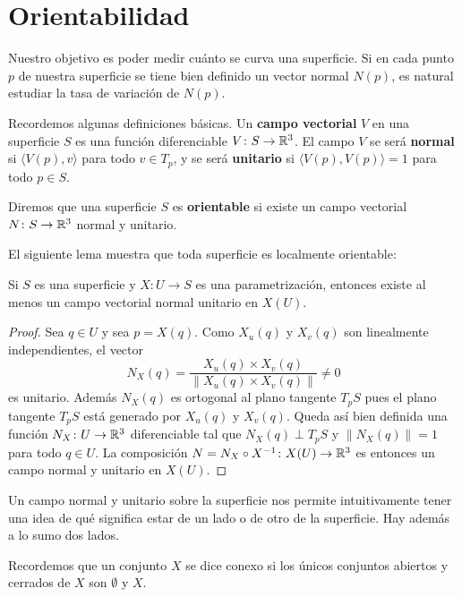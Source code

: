 \chapter{Orientabilidad}

Nuestro objetivo es poder medir cuánto se curva una superficie. Si en cada
punto $p$ de nuestra superficie se tiene bien definido un vector normal $N(p)$,
es natural estudiar la tasa de variación de $N(p)$. 

Recordemos algunas definiciones básicas.  Un \textbf{campo vectorial} $V$ en
una superficie $S$ es una función diferenciable $V\colon S\to\mathbb{R}^3$. El campo
$V$ se será \textbf{normal} si $\langle V(p), v\rangle$ para todo $v\in T_p$, y
se será \textbf{unitario} si $\langle V(p),V(p)\rangle=1$ para todo $p\in S$. 

\begin{definition}
	Diremos que una superficie $S$ es \textbf{orientable} si existe un campo
	vectorial $N\colon S\to\mathbb{R}^3$ normal y unitario.
\end{definition}

El siguiente lema muestra que toda superficie es localmente orientable:

\begin{lemma}
	Si $S$ es una superficie y $X\colon U\to S$ es una parametrización,
	entonces existe al menos un campo vectorial normal unitario en $X(U)$.
\end{lemma}

\begin{proof}
	Sea $q\in U$ y sea $p=X(q)$. Como $X_u(q)$ y $X_v(q)$ son linealmente
	independientes, el vector
	\[
		N_X(q)=\frac{X_u(q)\times X_v(q)}{\|X_u(q)\times X_v(q)\|}\ne 0
	\]
	es unitario. Además $N_X(q)$ es ortogonal al plano tangente $T_pS$ pues el
	plano tangente $T_pS$ está generado por $X_u(q)$ y $X_v(q)$.  Queda así
	bien definida una función $N_X\colon U\to\mathbb{R}^3$ diferenciable tal que
	$N_X(q)\perp T_{p}S$ y $\|N_X(q)\|=1$ para todo $q\in U$.  La composición
	$N=N_X\circ X^{-1}\colon X(U)\to\mathbb{R}^3$ es entonces un campo normal y unitario en
	$X(U)$.
\end{proof}

Un campo normal y unitario sobre la superficie nos permite intuitivamente tener
una idea de qué significa estar de un lado o de otro de la superficie. Hay
además a lo sumo dos lados.

Recordemos que un conjunto $X$ se dice conexo si los únicos conjuntos abiertos
y cerrados de $X$ son $\emptyset$ y $X$.

